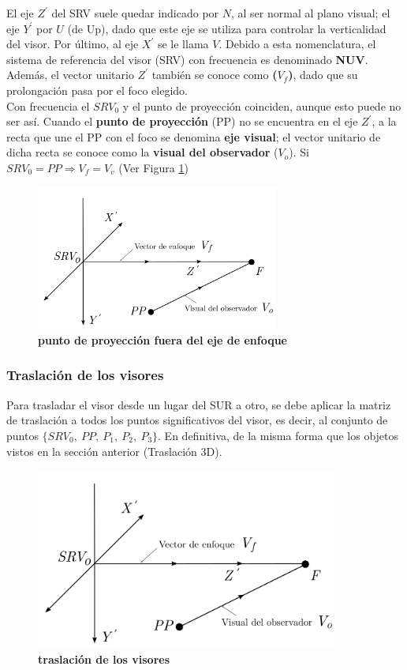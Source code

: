 El eje $Z^{\prime}$ del SRV suele quedar indicado por $N$, al ser normal al plano visual; el eje $Y^{\prime}$ por $U$ (de Up), dado que este eje se utiliza para controlar la verticalidad del visor. Por último, al eje $X^{\prime}$ se le llama $V$. Debido a esta nomenclatura, el sistema de referencia del visor (SRV) con frecuencia es denominado \textbf{NUV}. Además, el vector unitario $Z^{\prime}$ también se conoce como  \textbf{($V_f$)}, dado que su prolongación pasa por el foco elegido.\\
Con frecuencia el $SRV_0$ y el punto de proyección coinciden, aunque esto puede no ser así. Cuando el \textbf{punto de proyección} (PP) no se encuentra en el eje $Z^{\prime}$, a la recta que une el PP con el foco se denomina \textbf{eje visual}; el vector unitario de dicha recta se conoce como la \textbf{visual del observador} ($V_o$). Si $SRV_0 = PP {\Rightarrow} V_f = V_v$ (Ver Figura  \ref{geo-visor3})

\begin{figure}[h]
\includegraphics[width=8cm]{Img/GEO/geo-visor-3.png}
\centering
    \caption{\footnotesize{\textbf{punto de proyección fuera del eje de enfoque}}}
    \label{geo-visor3}
\end{figure}

\clearpage
\subsubsection{Traslación de los visores}
Para trasladar el visor desde un lugar del SUR a otro, se debe aplicar la matriz de traslación a todos los puntos significativos del visor, es decir, al conjunto de puntos $\{SRV_0, \ PP, \ P_1, \ P_2, \ P_3\}$. En definitiva, de la misma forma que los objetos vistos en la sección anterior (Traslación 3D).

\begin{figure}[h]
\includegraphics[width=10cm]{Img/GEO/geo-visor-4.png}
\centering
    \caption{\footnotesize{\textbf{traslación de los visores}}}
    \label{geo-visor4}
\end{figure}

